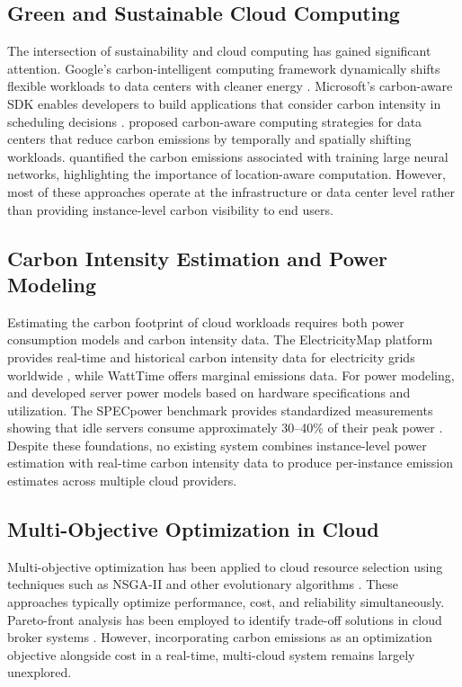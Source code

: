 \documentclass[12pt]{article}
\begin{document}
\subsection{Green and Sustainable Cloud Computing}

The intersection of sustainability and cloud computing has gained significant attention. Google's carbon-intelligent computing framework dynamically shifts flexible workloads to data centers with cleaner energy \citep{b3}. Microsoft's carbon-aware SDK enables developers to build applications that consider carbon intensity in scheduling decisions \citep{b4}. \citet{b7} proposed carbon-aware computing strategies for data centers that reduce carbon emissions by temporally and spatially shifting workloads. \citet{b8} quantified the carbon emissions associated with training large neural networks, highlighting the importance of location-aware computation. However, most of these approaches operate at the infrastructure or data center level rather than providing instance-level carbon visibility to end users.

\subsection{Carbon Intensity Estimation and Power Modeling}

Estimating the carbon footprint of cloud workloads requires both power consumption models and carbon intensity data. The ElectricityMap platform provides real-time and historical carbon intensity data for electricity grids worldwide \citep{b9}, while WattTime offers marginal emissions data. For power modeling, \citet{b10} and \citet{b11} developed server power models based on hardware specifications and utilization. The SPECpower benchmark provides standardized measurements showing that idle servers consume approximately 30--40\% of their peak power \citep{b12}. Despite these foundations, no existing system combines instance-level power estimation with real-time carbon intensity data to produce per-instance emission estimates across multiple cloud providers.

\subsection{Multi-Objective Optimization in Cloud}

Multi-objective optimization has been applied to cloud resource selection using techniques such as NSGA-II and other evolutionary algorithms \citep{b13}. These approaches typically optimize performance, cost, and reliability simultaneously. Pareto-front analysis has been employed to identify trade-off solutions in cloud broker systems \citep{b14}. However, incorporating carbon emissions as an optimization objective alongside cost in a real-time, multi-cloud system remains largely unexplored.
\end{document}

